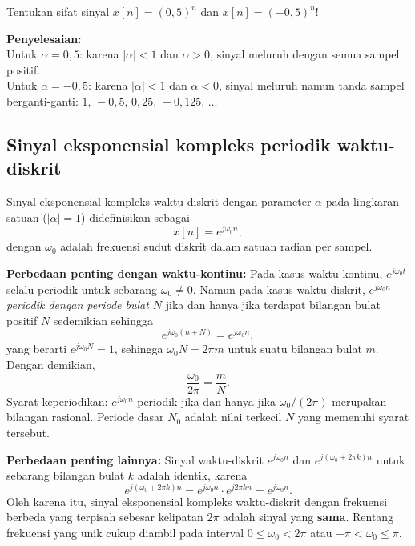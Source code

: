 \begin{exmp}
Tentukan sifat sinyal $x[n] = (0{,}5)^n$ dan $x[n] = (-0{,}5)^n$!

\textbf{Penyelesaian:}\\
Untuk $\alpha = 0{,}5$: karena $|\alpha| < 1$ dan $\alpha > 0$, sinyal meluruh dengan semua sampel positif.\\
Untuk $\alpha = -0{,}5$: karena $|\alpha| < 1$ dan $\alpha < 0$, sinyal meluruh namun tanda sampel berganti-ganti: $1,\,-0{,}5,\,0{,}25,\,-0{,}125,\,\ldots$
\end{exmp}

\subsection{Sinyal eksponensial kompleks periodik waktu-diskrit}

Sinyal eksponensial kompleks waktu-diskrit dengan parameter $\alpha$ pada lingkaran satuan ($|\alpha|=1$) didefinisikan sebagai
\begin{equation}
x[n] = e^{j\omega_0 n},
\end{equation}
dengan $\omega_0$ adalah frekuensi sudut diskrit dalam satuan radian per sampel.

\textbf{Perbedaan penting dengan waktu-kontinu:} Pada kasus waktu-kontinu, $e^{j\omega_0 t}$ selalu periodik untuk sebarang $\omega_0 \ne 0$. Namun pada kasus waktu-diskrit, $e^{j\omega_0 n}$ \textit{periodik dengan periode bulat $N$} jika dan hanya jika terdapat bilangan bulat positif $N$ sedemikian sehingga
\begin{equation}
e^{j\omega_0(n+N)} = e^{j\omega_0 n},
\end{equation}
yang berarti $e^{j\omega_0 N} = 1$, sehingga $\omega_0 N = 2\pi m$ untuk suatu bilangan bulat $m$. Dengan demikian,
\begin{equation}
\frac{\omega_0}{2\pi} = \frac{m}{N}.
\end{equation}
Syarat keperiodikan: $e^{j\omega_0 n}$ periodik jika dan hanya jika $\omega_0 / (2\pi)$ merupakan bilangan rasional. Periode dasar $N_0$ adalah nilai terkecil $N$ yang memenuhi syarat tersebut.

\textbf{Perbedaan penting lainnya:} Sinyal waktu-diskrit $e^{j\omega_0 n}$ dan $e^{j(\omega_0 + 2\pi k)n}$ untuk sebarang bilangan bulat $k$ adalah identik, karena
\[
e^{j(\omega_0+2\pi k)n} = e^{j\omega_0 n}\cdot e^{j2\pi kn} = e^{j\omega_0 n}.
\]
Oleh karena itu, sinyal eksponensial kompleks waktu-diskrit dengan frekuensi berbeda yang terpisah sebesar kelipatan $2\pi$ adalah sinyal yang \textbf{sama}. Rentang frekuensi yang unik cukup diambil pada interval $0 \le \omega_0 < 2\pi$ atau $-\pi < \omega_0 \le \pi$.

